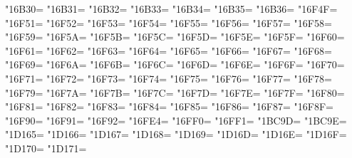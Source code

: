 \XeTeXcharclass"16B30=\KclassCM
\XeTeXcharclass"16B31=\KclassCM
\XeTeXcharclass"16B32=\KclassCM
\XeTeXcharclass"16B33=\KclassCM
\XeTeXcharclass"16B34=\KclassCM
\XeTeXcharclass"16B35=\KclassCM
\XeTeXcharclass"16B36=\KclassCM
\XeTeXcharclass"16F4F=\KclassCM
\XeTeXcharclass"16F51=\KclassCM
\XeTeXcharclass"16F52=\KclassCM
\XeTeXcharclass"16F53=\KclassCM
\XeTeXcharclass"16F54=\KclassCM
\XeTeXcharclass"16F55=\KclassCM
\XeTeXcharclass"16F56=\KclassCM
\XeTeXcharclass"16F57=\KclassCM
\XeTeXcharclass"16F58=\KclassCM
\XeTeXcharclass"16F59=\KclassCM
\XeTeXcharclass"16F5A=\KclassCM
\XeTeXcharclass"16F5B=\KclassCM
\XeTeXcharclass"16F5C=\KclassCM
\XeTeXcharclass"16F5D=\KclassCM
\XeTeXcharclass"16F5E=\KclassCM
\XeTeXcharclass"16F5F=\KclassCM
\XeTeXcharclass"16F60=\KclassCM
\XeTeXcharclass"16F61=\KclassCM
\XeTeXcharclass"16F62=\KclassCM
\XeTeXcharclass"16F63=\KclassCM
\XeTeXcharclass"16F64=\KclassCM
\XeTeXcharclass"16F65=\KclassCM
\XeTeXcharclass"16F66=\KclassCM
\XeTeXcharclass"16F67=\KclassCM
\XeTeXcharclass"16F68=\KclassCM
\XeTeXcharclass"16F69=\KclassCM
\XeTeXcharclass"16F6A=\KclassCM
\XeTeXcharclass"16F6B=\KclassCM
\XeTeXcharclass"16F6C=\KclassCM
\XeTeXcharclass"16F6D=\KclassCM
\XeTeXcharclass"16F6E=\KclassCM
\XeTeXcharclass"16F6F=\KclassCM
\XeTeXcharclass"16F70=\KclassCM
\XeTeXcharclass"16F71=\KclassCM
\XeTeXcharclass"16F72=\KclassCM
\XeTeXcharclass"16F73=\KclassCM
\XeTeXcharclass"16F74=\KclassCM
\XeTeXcharclass"16F75=\KclassCM
\XeTeXcharclass"16F76=\KclassCM
\XeTeXcharclass"16F77=\KclassCM
\XeTeXcharclass"16F78=\KclassCM
\XeTeXcharclass"16F79=\KclassCM
\XeTeXcharclass"16F7A=\KclassCM
\XeTeXcharclass"16F7B=\KclassCM
\XeTeXcharclass"16F7C=\KclassCM
\XeTeXcharclass"16F7D=\KclassCM
\XeTeXcharclass"16F7E=\KclassCM
\XeTeXcharclass"16F7F=\KclassCM
\XeTeXcharclass"16F80=\KclassCM
\XeTeXcharclass"16F81=\KclassCM
\XeTeXcharclass"16F82=\KclassCM
\XeTeXcharclass"16F83=\KclassCM
\XeTeXcharclass"16F84=\KclassCM
\XeTeXcharclass"16F85=\KclassCM
\XeTeXcharclass"16F86=\KclassCM
\XeTeXcharclass"16F87=\KclassCM
\XeTeXcharclass"16F8F=\KclassCM
\XeTeXcharclass"16F90=\KclassCM
\XeTeXcharclass"16F91=\KclassCM
\XeTeXcharclass"16F92=\KclassCM
\XeTeXcharclass"16FE4=\KclassCM
\XeTeXcharclass"16FF0=\KclassCM
\XeTeXcharclass"16FF1=\KclassCM
\XeTeXcharclass"1BC9D=\KclassCM
\XeTeXcharclass"1BC9E=\KclassCM
\XeTeXcharclass"1D165=\KclassCM
\XeTeXcharclass"1D166=\KclassCM
\XeTeXcharclass"1D167=\KclassCM
\XeTeXcharclass"1D168=\KclassCM
\XeTeXcharclass"1D169=\KclassCM
\XeTeXcharclass"1D16D=\KclassCM
\XeTeXcharclass"1D16E=\KclassCM
\XeTeXcharclass"1D16F=\KclassCM
\XeTeXcharclass"1D170=\KclassCM
\XeTeXcharclass"1D171=\KclassCM
